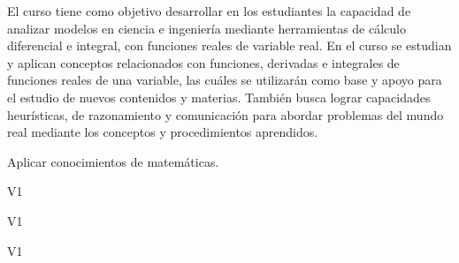 \begin{syllabus}


\begin{justification}
El curso tiene como objetivo desarrollar en los estudiantes la capacidad de analizar modelos en ciencia e ingeniería mediante herramientas de cálculo
diferencial e integral, con funciones reales de variable real.
En el curso se estudian y aplican conceptos relacionados con funciones, derivadas e integrales de funciones reales de una variable, las cuáles se utilizarán como base y apoyo para el estudio de nuevos contenidos y materias.
También busca lograr capacidades heurísticas, de razonamiento y comunicación para abordar problemas del mundo real mediante los conceptos y procedimientos aprendidos.
\end{justification}

\begin{goals}
\item Aplicar conocimientos de matemáticas.
\end{goals}

\begin{outcomes}{V1}
      \item {}
      \item {}
\end{outcomes}

\begin{specificoutcomes}{V1}
      \item {}
      \item {}
      \item {}
      \item {}
      \item {}
      \item {}
      \item {}
\end{specificoutcomes}

\begin{competences}{V1}
      \item {}
      \item {}
      \item {}
\end{competences}


\end{syllabus}
